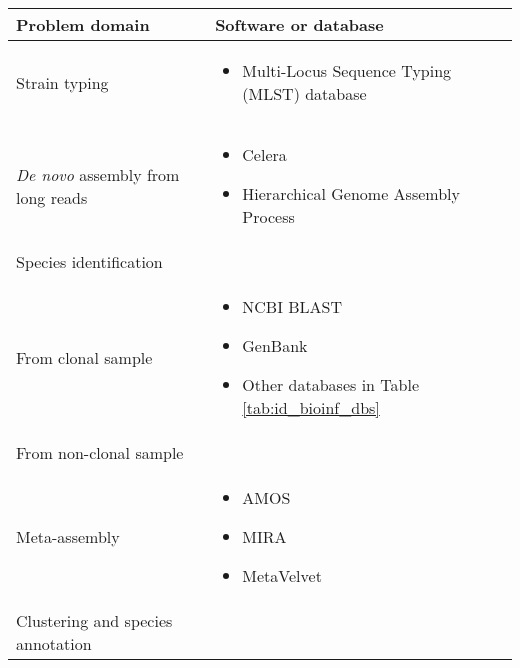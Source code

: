 \begin{table}[ht]
  \centering
  \small
  \begin{tabular}{l l}
    \toprule
    \textbf{Problem domain} & \textbf{Software or database}\\
    \midrule
    Strain typing &
    \begin{minipage}[t]{5cm}
      \raggedright
      \begin{itemize}[noitemsep]
      \item Multi-Locus Sequence Typing (MLST) database
      \end{itemize}
      \smallskip
    \end{minipage}
    \\
    \textit{De novo} assembly from long reads &
    \begin{minipage}[t]{5cm}
      \raggedright
      \begin{itemize}[noitemsep]
      \item Celera
      \item Hierarchical Genome Assembly Process
      \end{itemize}
    \end{minipage}
    \\
    Species identification &
    \\
    \-\tabindent From clonal sample &
    \begin{minipage}[t]{5cm}
      \raggedright
      \begin{itemize}[noitemsep]
      \item NCBI BLAST
      \item GenBank
      \item Other databases in Table \ref{tab:id_bioinf_dbs}
      \end{itemize}
    \end{minipage}
    \\
    \-\tabindent From non-clonal sample &
    \\
    \-\tabindent\tabindent  Meta-assembly &
    \begin{minipage}[t]{5cm}
      \raggedright
      \begin{itemize}[noitemsep]
      \item AMOS
      \item MIRA
      \item MetaVelvet
      \end{itemize}
      \smallskip
    \end{minipage}
    \\
    \-\tabindent\tabindent Clustering and species annotation &

\end{tabular}
\end{table}
